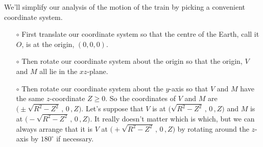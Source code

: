 \begin{eg}
We'll simplify our analysis of the motion of the train by 
picking a convenient coordinate system. 
\begin{itemize}\itemsep1pt \parskip0pt  %
\item[$\circ$]
First translate our coordinate system so that the centre of the
Earth, call it $O$, is at the origin, $(0,0,0)$.
\item[$\circ$]
Then rotate our coordinate system about the origin so that the origin,
$V$ and $M$ all lie in the $xz$-plane.
\item[$\circ$]
Then rotate our coordinate system about the $y$-axis so that $V$ and $M$
have the same $z$-coordinate $Z\ge 0$. So the coordinates of $V$ and $M$
are $\big(\pm\sqrt{R^2-Z^2}\,,\,0\,,Z\big)$. Let's suppose that $V$ is
at $\big(\sqrt{R^2-Z^2}\,,\,0\,,Z\big)$ and $M$ is at
$\big(-\sqrt{R^2-Z^2}\,,\,0\,,Z\big)$. It really doesn't matter which is which,
but we can always arrange that it is $V$ at 
$\big(+\sqrt{R^2-Z^2}\,,\,0\,,Z\big)$ by rotating around the
$z$-axis by $180^\circ$ if necessary.

\end{itemize}


\end{eg}
